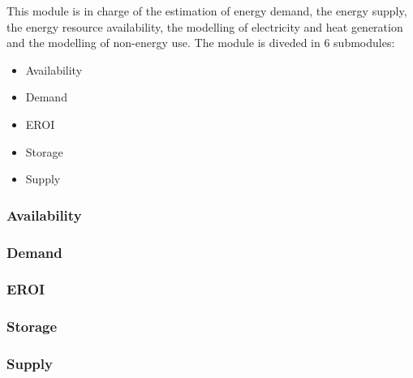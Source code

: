This module is in charge of the estimation of energy demand, the energy supply, the energy resource availability, the modelling of electricity and heat generation and the modelling of non-energy use. The module is diveded in 6 submodules:

\begin{itemize}
    \item Availability
    \item Demand
    \item EROI
    \item Storage
    \item Supply
\end{itemize}

\subsubsection{Availability}
    \label{se:energy-availability}
    

\subsubsection{Demand}
    \label{se:energy-demand}
    

\subsubsection{EROI}
    \label{se:energy-eroi}
    

\subsubsection{Storage}
    \label{se:energy-storage}
    

\subsubsection{Supply}
    \label{se:energy-supply}
    
